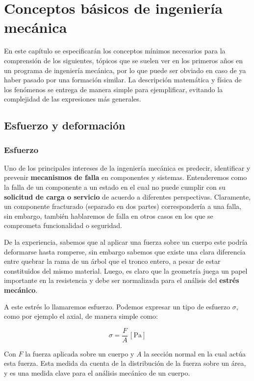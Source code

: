 \chapter{Conceptos básicos de ingeniería mecánica}

En este capítulo se especificarán los conceptos mínimos necesarios para la comprensión de los siguientes, tópicos que se suelen ver en los primeros años en un programa de ingeniería mecánica, por lo que puede ser obviado en caso de ya haber pasado por una formación similar. La descripción matemática y física de los fenómenos se entrega de manera simple para ejemplificar, evitando la complejidad de las expresiones más generales.

\section{Esfuerzo y deformación}

\subsection{Esfuerzo}

Uno de los principales intereses de la ingeniería mecánica es predecir, identificar y prevenir \textbf{mecanismos de falla} en componentes y sistemas. Entenderemos como la falla de un componente a un estado en el cual no puede cumplir con su \textbf{solicitud de carga o servicio} de acuerdo a diferentes perspectivas. Claramente, un componente fracturado (separado en dos partes) correspondería a una falla, sin embargo, también hablaremos de falla en otros casos en los que se comprometa funcionalidad o seguridad.

De la experiencia, sabemos que al aplicar una fuerza sobre un cuerpo este podría deformarse hasta romperse, sin embargo sabemos que existe una clara diferencia entre quebrar la rama de un árbol que el tronco entero, a pesar de estar constituidos del mismo material. Luego, es claro que la geometría juega un papel importante en la resistencia y debe ser normalizada para el análisis del \textbf{estrés mecánico}.

A este estrés lo llamaremos esfuerzo. Podemos expresar un tipo de esfuerzo $\sigma$, como por ejemplo el axial, de manera simple como:

\begin{equation}
    \sigma = \frac{F}{A}\,\mathrm{[Pa]}
    \label{eq1}
\end{equation}

Con $F$ la fuerza aplicada sobre un cuerpo y $A$ la sección normal en la cual actúa esta fuerza. Esta medida da cuenta de la distribución de la fuerza sobre un área, y es una medida clave para el análisis mecánico de un cuerpo. 

